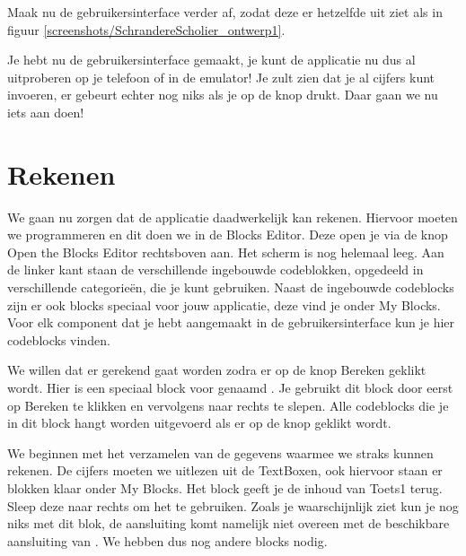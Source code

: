 \begin{opgave}
    \opgVraag
Maak nu de gebruikersinterface verder af, zodat deze er hetzelfde uit ziet als in figuur \ref{screenshots/SchrandereScholier_ontwerp1}.
\end{opgave}

\runOpTelefoon{}
Je hebt nu de gebruikersinterface gemaakt, je kunt de applicatie nu dus al uitproberen op je telefoon of in de emulator! Je zult zien dat je al cijfers kunt invoeren, er gebeurt echter nog niks als je op de knop drukt. Daar gaan we nu iets aan doen!

\section{Rekenen}
We gaan nu zorgen dat de applicatie daadwerkelijk kan rekenen. Hiervoor moeten we programmeren en dit doen we in de Blocks Editor. Deze open je via de knop Open the Blocks Editor rechtsboven aan.  Het scherm is nog helemaal leeg. Aan de linker kant staan de verschillende ingebouwde codeblokken, opgedeeld in verschillende categorie\"en, die je kunt gebruiken. Naast de ingebouwde codeblocks zijn er ook blocks speciaal voor jouw applicatie, deze vind je onder My Blocks. Voor elk component dat je hebt aangemaakt in de gebruikersinterface kun je hier codeblocks vinden.

We willen dat er gerekend gaat worden zodra er op de knop Bereken geklikt wordt. Hier is een speciaal block voor genaamd . Je gebruikt dit block door eerst op Bereken te klikken en vervolgens  naar rechts te slepen. Alle codeblocks die je in dit block hangt worden uitgevoerd als er op de knop geklikt wordt.

We beginnen met het verzamelen van de gegevens waarmee we straks kunnen rekenen. De cijfers moeten we uitlezen uit de TextBoxen, ook hiervoor staan er blokken klaar onder My Blocks. Het block  geeft je de inhoud van Toets1 terug. Sleep deze naar rechts om het te gebruiken. Zoals je waarschijnlijk ziet kun je nog niks met dit blok, de aansluiting komt namelijk niet overeen met de beschikbare aansluiting van . We hebben dus nog andere blocks nodig.

